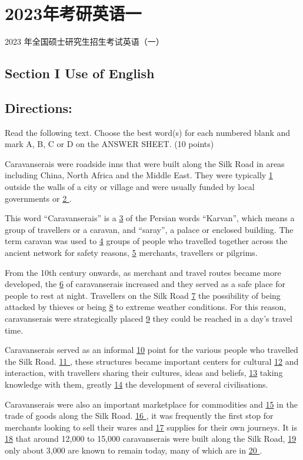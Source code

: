 \documentclass[UTF8,11pt]{ctexart}
\begin{document}
\section*{2023年考研英语一}
2023 年全国硕士研究生招生考试英语（一）


\subsection*{\textbf{Section I Use of English}}


\subsection*{\textbf{Directions:}}


Read the following text. Choose the best word(s) for each numbered blank and mark A, B, C or D on the ANSWER SHEET. (10 points)


Caravanserais were roadside inns that were built along the Silk Road in areas including China, North Africa and the Middle East. They were typically \uline{1} outside the walls of a city or village and were usually funded by local governments or \uline{2 }.


This word “Caravanserais” is a \uline{3} of the Persian words “Karvan”, which means a group of travellers or a caravan, and “saray”, a palace or enclosed building. The term caravan was used to \uline{4} groups of people who travelled together across the ancient network for safety reasons, \uline{5} merchants, travellers or pilgrims.


From the 10th century onwards, as merchant and travel routes became more developed, the \uline{6} of caravanserais increased and they served as a safe place for people to rest at night. Travellers on the Silk Road \uline{7} the possibility of being attacked by thieves or being \uline{8} to extreme weather conditions. For this reason, caravanserais were strategically placed \uline{9} they could be reached in a day’s travel time.


Caravanserais served as an informal \uline{10} point for the various people who travelled the Silk Road. \uline{11 }, these structures became important centers for cultural \uline{12} and interaction, with travellers sharing their cultures, ideas and beliefs, \uline{13} taking knowledge with them, greatly \uline{14} the development of several civilisations.


Caravanserais were also an important marketplace for commodities and \uline{15} in the trade of goods along the Silk Road. \uline{16 }, it was frequently the first stop for merchants looking to sell their wares and \uline{17} supplies for their own journeys. It is \uline{18} that around 12,000 to 15,000 caravanserais were built along the Silk Road, \uline{19} only about 3,000 are known to remain today, many of which are in \uline{20 }.
\end{document}
